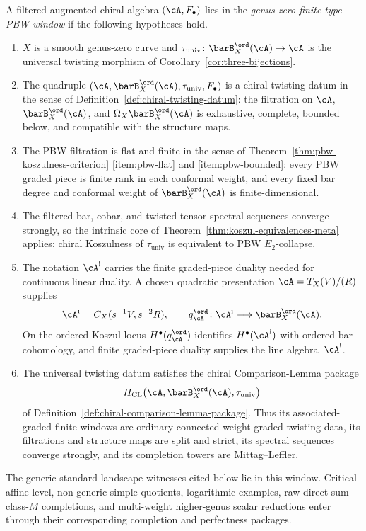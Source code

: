 \begin{definition}
\label{def:ftm-g0-pbw-window}
A filtered augmented chiral algebra $(\cA,F_\bullet)$ lies in the
\emph{genus-zero finite-type PBW window} if the following hypotheses
hold.
\begin{enumerate}[label=\textup{(W\arabic*)}]
\item $X$ is a smooth genus-zero curve and
$\tau_{\mathrm{univ}}\colon \barB^{\ord}_X(\cA)\to\cA$ is the
universal twisting morphism of
Corollary~\ref{cor:three-bijections}.
\item The quadruple
$(\cA,\barB^{\ord}_X(\cA),\tau_{\mathrm{univ}},F_\bullet)$ is a
chiral twisting datum in the sense of
Definition~\ref{def:chiral-twisting-datum}: the filtration on
$\cA$, $\barB^{\ord}_X(\cA)$, and
$\Omega_X\barB^{\ord}_X(\cA)$ is exhaustive, complete, bounded
below, and compatible with the structure maps.
\item The PBW filtration is flat and finite in the sense of
Theorem~\ref{thm:pbw-koszulness-criterion}
\textup{\ref{item:pbw-flat}} and
\textup{\ref{item:pbw-bounded}}: every PBW graded piece is finite
rank in each conformal weight, and every fixed bar degree and
conformal weight of $\barB^{\ord}_X(\cA)$ is finite-dimensional.
\item The filtered bar, cobar, and twisted-tensor spectral sequences
converge strongly, so the intrinsic core of
Theorem~\ref{thm:koszul-equivalences-meta} applies:
chiral Koszulness of $\tau_{\mathrm{univ}}$ is equivalent to PBW
$E_2$-collapse.
\item The notation $\cA^!$ carries the finite graded-piece duality
 needed for continuous linear duality.  A chosen quadratic presentation
 $\cA=T_X(V)/(R)$ supplies
 \[
 \cA^{\mathrm i}=C_X(s^{-1}V,s^{-2}R),\qquad
 q_\cA^{\ord}\colon\cA^{\mathrm i}\longrightarrow
 \barB_X^{\ord}(\cA).
 \]
 On the ordered Koszul locus $H^\bullet(q_\cA^{\ord})$ identifies
 $H^\bullet(\cA^{\mathrm i})$ with ordered bar cohomology, and
 finite graded-piece duality supplies the line algebra~$\cA^!$.
\item The universal twisting datum satisfies the chiral
Comparison-Lemma package
\[
 H_{\mathrm{CL}}\bigl(
 \cA,\barB^{\ord}_X(\cA),\tau_{\mathrm{univ}}\bigr)
\]
of Definition~\ref{def:chiral-comparison-lemma-package}.  Thus its
associated-graded finite windows are ordinary connected
weight-graded twisting data, its filtrations and structure maps are
split and strict, its spectral sequences converge strongly, and its
completion towers are Mittag--Leffler.
\end{enumerate}
The generic standard-landscape witnesses cited below lie in this
window.  Critical affine level, non-generic simple quotients,
logarithmic examples, raw direct-sum class-$M$ completions, and
multi-weight higher-genus scalar reductions enter through their
corresponding completion and perfectness packages.
\end{definition}

